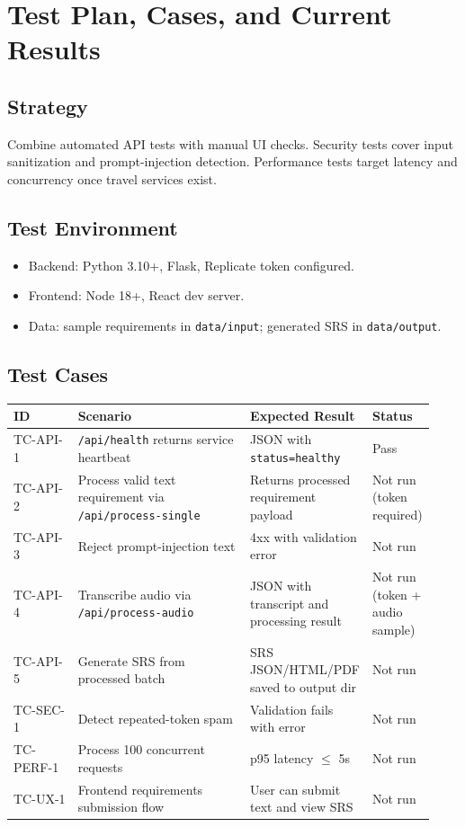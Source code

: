 \documentclass[11pt]{article}
\begin{document}
\section{Test Plan, Cases, and Current Results}
\subsection{Strategy}
Combine automated API tests with manual UI checks. Security tests cover input sanitization and prompt-injection detection. Performance tests target latency and concurrency once travel services exist.

\subsection{Test Environment}
\begin{itemize}
  \item Backend: Python 3.10+, Flask, Replicate token configured.
  \item Frontend: Node 18+, React dev server.
  \item Data: sample requirements in \texttt{data/input}; generated SRS in \texttt{data/output}.
\end{itemize}

\subsection{Test Cases}
\begin{longtable}{p{0.16\linewidth} p{0.45\linewidth} p{0.18\linewidth} p{0.14\linewidth}}
\toprule
\textbf{ID} & \textbf{Scenario} & \textbf{Expected Result} & \textbf{Status} \\
\midrule
TC-API-1 & \texttt{/api/health} returns service heartbeat & JSON with \texttt{status=healthy} & Pass \\
TC-API-2 & Process valid text requirement via \texttt{/api/process-single} & Returns processed requirement payload & Not run (token required) \\
TC-API-3 & Reject prompt-injection text & 4xx with validation error & Not run \\
TC-API-4 & Transcribe audio via \texttt{/api/process-audio} & JSON with transcript and processing result & Not run (token + audio sample) \\
TC-API-5 & Generate SRS from processed batch & SRS JSON/HTML/PDF saved to output dir & Not run \\
TC-SEC-1 & Detect repeated-token spam & Validation fails with error & Not run \\
TC-PERF-1 & Process 100 concurrent requests & p95 latency $\leq$ 5s & Not run \\
TC-UX-1 & Frontend requirements submission flow & User can submit text and view SRS & Not run \\
\bottomrule
\end{longtable}
\end{document}
